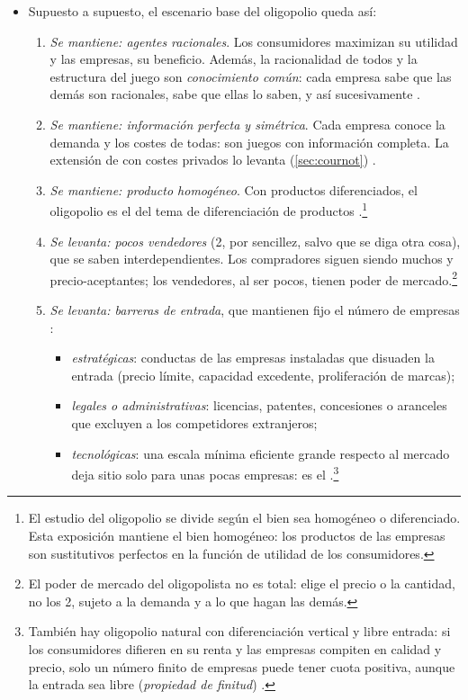\documentclass[11pt]{article}
\begin{document}
\begin{itemize}
\item Supuesto a supuesto, el escenario base del oligopolio queda así:
  \begin{enumerate}
  \item \emph{Se mantiene: agentes racionales}. Los consumidores maximizan su utilidad y las empresas, su beneficio. Además, la racionalidad de todos y la estructura del juego son \emph{conocimiento común}: cada empresa sabe que las demás son racionales, sabe que ellas lo saben, y así sucesivamente .
  \item \emph{Se mantiene: información perfecta y simétrica}. Cada empresa conoce la demanda y los costes de todas: son juegos con información completa. La extensión de  con costes privados lo levanta (\ref{sec:cournot}) .
  \item \emph{Se mantiene: producto homogéneo}. Con productos diferenciados, el oligopolio es el del tema de diferenciación de productos .\footnote{El estudio del oligopolio se divide según el bien sea homogéneo o diferenciado. Esta exposición mantiene el bien homogéneo: los productos de las empresas son sustitutivos perfectos en la función de utilidad de los consumidores.}
  \item \emph{Se levanta: pocos vendedores} (2, por sencillez, salvo que se diga otra cosa), que se saben interdependientes. Los compradores siguen siendo muchos y precio-aceptantes; los vendedores, al ser pocos, tienen poder de mercado.\footnote{El poder de mercado del oligopolista no es total: elige el precio o la cantidad, no los 2, sujeto a la demanda y a lo que hagan las demás.}
  \item \emph{Se levanta: barreras de entrada}, que mantienen fijo el número de empresas :
    \begin{itemize}
    \item \emph{estratégicas}: conductas de las empresas instaladas que disuaden la entrada (precio límite, capacidad excedente, proliferación de marcas);
    \item \emph{legales o administrativas}: licencias, patentes, concesiones o aranceles que excluyen a los competidores extranjeros;
    \item \emph{tecnológicas}: una escala mínima eficiente grande respecto al mercado deja sitio solo para unas pocas empresas: es el  .\footnote{También hay oligopolio natural con diferenciación vertical y libre entrada: si los consumidores difieren en su renta y las empresas compiten en calidad y precio, solo un número finito de empresas puede tener cuota positiva, aunque la entrada sea libre (\emph{propiedad de finitud})\nocite{ShakedSutton1983Natural} .}

\end{itemize}
\end{enumerate}
\end{itemize}
\end{document}
